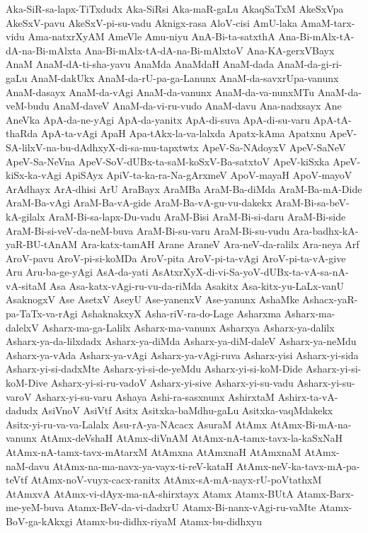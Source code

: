 {Aka-SiR-sa-lapx-TiTxdudx
Aka-SiRsi
Aka-maR-gaLu
AkaqSaTxM
AkeSxVpa
AkeSxV-pavu
AkeSxV-pi-su-vadu
Aknigx-rasa
AloV-cisi
AmU-laka
AmaM-tarx-vidu
Ama-natxrXyAM
AmeVle
Amu-niyu
AnA-Bi-ta-satxthA
Ana-Bi-mAlx-tA-dA-na-Bi-mAlxta
Ana-Bi-mAlx-tA-dA-na-Bi-mAlxtoV
Ana-KA-gerxVBayx
AnaM
AnaM-dA-ti-sha-yavu
AnaMda
AnaMdaH
AnaM-dada
AnaM-da-gi-ri-gaLu
AnaM-dakUkx
AnaM-da-rU-pa-ga-Lanunx
AnaM-da-savxrUpa-vanunx
AnaM-dasayx
AnaM-da-vAgi
AnaM-da-vanunx
AnaM-da-va-nunxMTu
AnaM-da-veM-budu
AnaM-daveV
AnaM-da-vi-ru-vudo
AnaM-davu
Ana-nadxsayx
Ane
AneVka
ApA-da-ne-yAgi
ApA-da-yanitx
ApA-di-suva
ApA-di-su-varu
ApA-tA-thaRda
ApA-ta-vAgi
ApaH
Apa-tAkx-la-va-lalxda
Apatx-kAma
Apatxnu
ApeV-SA-lilxV-na-bu-dAdhxyX-di-sa-mu-tapxtwtx
ApeV-Sa-NAdoyxV
ApeV-SaNeV
ApeV-Sa-NeVna
ApeV-SoV-dUBx-ta-saM-koSxV-Ba-satxtoV
ApeV-kiSxka
ApeV-kiSx-ka-vAgi
ApiSAyx
ApiV-ta-ka-ra-Na-gArxmeV
ApoV-mayaH
ApoV-mayoV
ArAdhayx
ArA-dhisi
ArU
AraBayx
AraMBa
AraM-Ba-diMda
AraM-Ba-mA-Dide
AraM-Ba-vAgi
AraM-Ba-vA-gide
AraM-Ba-vA-gu-vu-dakekx
AraM-Bi-sa-beV-kA-gilalx
AraM-Bi-sa-lapx-Du-vadu
AraM-Bisi
AraM-Bi-si-daru
AraM-Bi-side
AraM-Bi-si-veV-da-neM-buva
AraM-Bi-su-varu
AraM-Bi-su-vudu
Ara-badhx-kA-yaR-BU-tAnAM
Ara-katx-tamAH
Arane
AraneV
Ara-neV-da-ralilx
Ara-neya
Arf
AroV-pavu
AroV-pi-si-koMDa
AroV-pita
AroV-pi-ta-vAgi
AroV-pi-ta-vA-give
Aru
Aru-ba-ge-yAgi
AsA-da-yati
AsAtxrXyX-di-vi-Sa-yoV-dUBx-ta-vA-sa-nA-vA-sitaM
Asa
Asa-katx-vAgi-ru-vu-da-riMda
Asakitx
Asa-kitx-yu-LaLx-vanU
AsaknogxV
Ase
AsetxV
AseyU
Ase-yanenxV
Ase-yanunx
AshaMke
Ashacx-yaR-pa-TaTx-va-rAgi
AshaknakxyX
Asha-riV-ra-do-Lage
Asharxma
Asharx-ma-dalelxV
Asharx-ma-ga-Lalilx
Asharx-ma-vanunx
Asharxya
Asharx-ya-dalilx
Asharx-ya-da-lilxdadx
Asharx-ya-diMda
Asharx-ya-diM-daleV
Asharx-ya-neMdu
Asharx-ya-vAda
Asharx-ya-vAgi
Asharx-ya-vAgi-ruva
Asharx-yisi
Asharx-yi-sida
Asharx-yi-si-dadxMte
Asharx-yi-si-de-yeMdu
Asharx-yi-si-koM-Dide
Asharx-yi-si-koM-Dive
Asharx-yi-si-ru-vadoV
Asharx-yi-sive
Asharx-yi-su-vadu
Asharx-yi-su-varoV
Asharx-yi-su-varu
Ashaya
Ashi-ra-sasxnunx
AshirxtaM
Ashirx-ta-vA-dadudx
AsiVnoV
AsiVtf
Asitx
Asitxka-baMdhu-gaLu
Asitxka-vaqMdakekx
Asitx-yi-ru-va-va-Lalalx
Asu-rA-ya-NAcacx
AsuraM
AtAmx
AtAmx-Bi-mA-na-vanunx
AtAmx-deVshaH
AtAmx-diVnAM
AtAmx-nA-tamx-tavx-la-kaSxNaH
AtAmx-nA-tamx-tavx-mAtarxM
AtAmxna
AtAmxnaH
AtAmxnaM
AtAmx-naM-davu
AtAmx-na-ma-navx-ya-vayx-ti-reV-kataH
AtAmx-neV-ka-tavx-mA-pa-teVtf
AtAmx-noV-vuyx-cacx-ranitx
AtAmx-sA-mA-nayx-rU-poVtathxM
AtAmxvA
AtAmx-vi-dAyx-ma-nA-shirxtayx
Atamx
Atamx-BUtA
Atamx-Barx-me-yeM-buva
Atamx-BeV-da-vi-dadxrU
Atamx-Bi-nanx-vAgi-ru-vaMte
Atamx-BoV-ga-kAkxgi
Atamx-bu-didhx-riyaM
Atamx-bu-didhxyu
}
